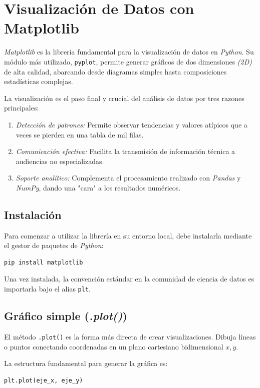 \section{Visualización de Datos con Matplotlib}

\textit{Matplotlib} es la librería fundamental para la visualización de datos en \textit{Python}. Su módulo más utilizado, \texttt{pyplot}, permite generar gráficos de dos dimensiones \textit{(2D)} de alta calidad, abarcando desde diagramas simples hasta composiciones estadísticas complejas.

La visualización es el paso final y crucial del análisis de datos por tres razones principales:
\begin{enumerate}
\item \textit{Detección de patrones:} Permite observar tendencias y valores atípicos que a veces se pierden en una tabla de mil filas.
\item \textit{Comunicación efectiva:} Facilita la transmisión de información técnica a audiencias no especializadas.
\item \textit{Soporte analítico:} Complementa el procesamiento realizado con \textit{Pandas} y \textit{NumPy}, dando una "cara" a los resultados numéricos.
\end{enumerate}

\subsection{Instalación}

Para comenzar a utilizar la librería en su entorno local, debe instalarla mediante el gestor de paquetes de \textit{Python}:

\begin{verbatim}
pip install matplotlib
\end{verbatim}

Una vez instalada, la convención estándar en la comunidad de ciencia de datos es importarla bajo el alias \texttt{plt}.



\subsection{Gráfico simple (\textit{.plot()})}

El método \texttt{.plot()} es la forma más directa de crear visualizaciones. Dibuja líneas o puntos conectando coordenadas en un plano cartesiano bidimensional \(x,y\).

La estructura fundamental para generar la gráfica es:
\begin{verbatim}
plt.plot(eje_x, eje_y)
\end{verbatim}

